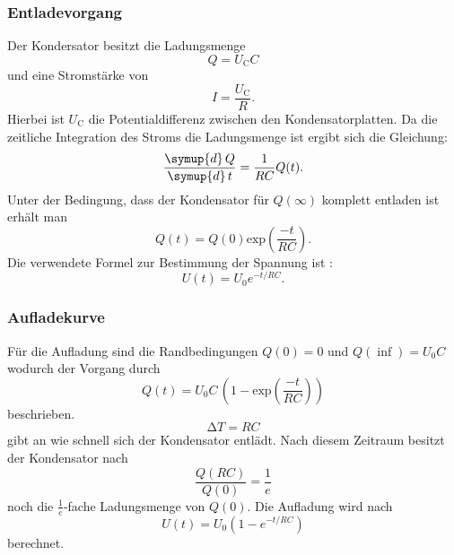 \subsubsection{Entladevorgang}
Der Kondersator besitzt die Ladungsmenge
\begin{equation}
  Q = U_\text{C}C
  \label{eqn:2}
\end{equation}
und eine Stromstärke von
\begin{equation}
  I = \frac{U_\text{C}}{R}.
  \label{eqn:3}
\end{equation}
Hierbei ist $U_\text{C}$ die Potentialdifferenz zwischen den
Kondensatorplatten.
Da die zeitliche Integration des Stroms die Ladungsmenge ist ergibt sich die Gleichung:
\begin{equation}
  \frac{\symup{d}\,Q}{\symup{d}\, t} = \frac{1}{RC}Q(t).
  \label{eqn:4}
\end{equation}
Unter der Bedingung, dass der Kondensator für $Q(\infty)$ komplett entladen ist
erhält man
\begin{equation}
 Q(t) =  Q(0) \text{exp}\left(\frac{-t}{RC}\right).
\label{eqn:5}
\end{equation}
Die verwendete Formel zur Bestimmung der Spannung ist :
\begin{equation}
  U(t)=U_0e^{-t/RC}.
  \label{eqn:entladen}
\end{equation}

\subsubsection{Aufladekurve}
Für die Aufladung sind die Randbedingungen $Q(0) = 0$ und $Q(\inf) = U_0 C$ wodurch
der Vorgang durch
\begin{equation}
  Q(t) = U_0C\, \left(1 - \text{exp}\left(\frac{-t}{RC}\right)\right)
  \label{eqn:6}
\end{equation}
beschrieben.
\begin{equation}
  \increment T = RC
  \label{eqn:7}
\end{equation}
gibt an wie schnell sich der Kondensator entlädt. Nach diesem Zeitraum
besitzt der Kondensator nach
\begin{equation}
\frac{Q(RC)}{Q(0)} = \frac{1}{e}
\label{eqn:8}
\end{equation}
noch die $\frac{1}{e}$-fache Ladungsmenge von $Q(0)$.
Die Aufladung wird nach
\begin{equation}
  U(t)=U_0\left(1-e^{-t/RC}\right)
  \label{eqn:aufladen}
\end{equation}
berechnet.

